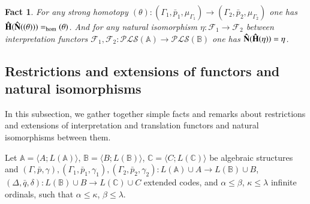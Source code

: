 \documentclass[12pt]{article}
\newtheorem{fact}{Fact}
\theoremstyle{definition}
\def\MA{{\mathbb{A}}}
\def\MB{{\mathbb{B}}}
\def\MC{{\mathbb{C}}}
\def\F{{\mathcal{F}}}
\def\PLS{{\mathcal{PLS}}}
\begin{document}
\begin{fact}\label{fact:hat4}
For any strong homotopy $(\theta)\colon (\Gamma_1,\bar p_1,\mu_{\Gamma_1})\to (\Gamma_2,\bar p_2,\mu_{\Gamma_2})$ one has ${\bf \hat H}({\bf \hat N}((\theta)))=_{\rm hom}(\theta)$. And for any natural isomorphism $\eta\colon \F_1\to\F_2$ between interpretation functors $\F_1,\F_2\colon \PLS(\MA)\to \PLS(\MB)$ one has ${\bf \hat N}({\bf \hat H}(\eta))=\eta$.
\end{fact}

\subsection{Restrictions and extensions of functors and natural isomorphisms}\label{subsec:re}

In this subsection, we gather together simple facts and remarks about restrictions and extensions of interpretation and translation functors and natural isomorphisms between them.

Let $\MA=\langle A; L(\MA)\rangle$,  $\MB=\langle B; L(\MB)\rangle$, $\MC=\langle C; L(\MC)\rangle$  be algebraic structures and $(\Gamma,\bar p,\gamma), (\Gamma_1,\bar p_1,\gamma_1), (\Gamma_2,\bar p_2,\gamma_2)\colon L(\MA)\cup A\to L(\MB)\cup B$, $(\Delta,\bar q,\delta)\colon L(\MB)\cup B\to L(\MC)\cup C$ extended codes, and $\alpha\leqslant \beta$, $\kappa\leqslant\lambda$ infinite ordinals, such that $\alpha\leqslant\kappa$, $\beta\leqslant \lambda$.
\end{document}
